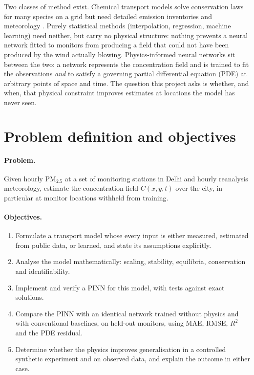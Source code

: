 \documentclass[11pt,a4paper]{article}
\newcommand{\PMtwo}{PM$_{2.5}$}
\begin{document}
Two classes of method exist. Chemical transport models solve conservation laws for many species on a
grid but need detailed emission inventories and meteorology \citep{seinfeld2016,stockie2011}. Purely
statistical methods (interpolation, regression, machine learning) need neither, but carry no physical
structure: nothing prevents a neural network fitted to monitors from producing a field that could not
have been produced by the wind actually blowing. Physics-informed neural networks
\citep{raissi2019,karniadakis2021} sit between the two: a network represents the concentration field and is
trained to fit the observations \emph{and} to satisfy a governing partial differential equation (PDE) at
arbitrary points of space and time. The question this project asks is whether, and when, that physical
constraint improves estimates at locations the model has never seen.

\section{Problem definition and objectives}
\paragraph{Problem.} Given hourly \PMtwo{} at a set of monitoring stations in Delhi and hourly
reanalysis meteorology, estimate the concentration field $C(x,y,t)$ over the city, in particular at
monitor locations withheld from training.

\paragraph{Objectives.}
\begin{enumerate}
\item Formulate a transport model whose every input is either measured, estimated from public data, or
      learned, and state its assumptions explicitly.
\item Analyse the model mathematically: scaling, stability, equilibria, conservation and identifiability.
\item Implement and verify a PINN for this model, with tests against exact solutions.
\item Compare the PINN with an identical network trained without physics and with conventional baselines,
      on held-out monitors, using MAE, RMSE, $R^2$ and the PDE residual.
\item Determine whether the physics improves generalisation in a controlled synthetic experiment and on
      observed data, and explain the outcome in either case.
\end{enumerate}
\end{document}
